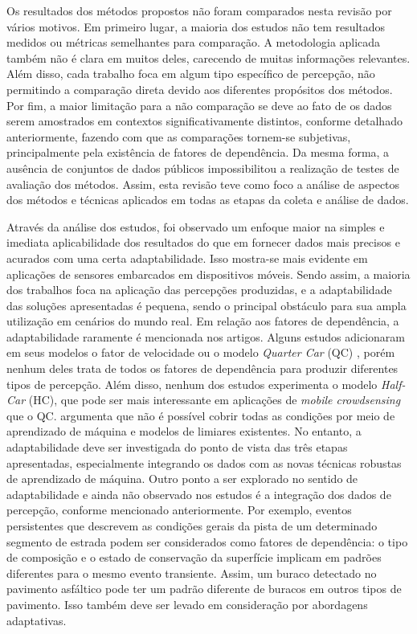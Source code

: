 Os resultados dos métodos propostos não foram comparados nesta revisão por vários motivos. Em primeiro lugar, a maioria dos estudos não tem resultados medidos ou métricas semelhantes para comparação. A metodologia aplicada também não é clara em muitos deles, carecendo de muitas informações relevantes. Além disso, cada trabalho foca em algum tipo específico de percepção, não permitindo a comparação direta devido aos diferentes propósitos dos métodos. Por fim, a maior limitação para a não comparação se deve ao fato de os dados serem amostrados em contextos significativamente distintos, conforme detalhado anteriormente, fazendo com que as comparações tornem-se subjetivas, principalmente pela existência de fatores de dependência. Da mesma forma, a ausência de conjuntos de dados públicos impossibilitou a realização de testes de avaliação dos métodos. Assim, esta revisão teve como foco a análise de aspectos dos métodos e técnicas aplicados em todas as etapas da coleta e análise de dados.

Através da análise dos estudos, foi observado um enfoque maior na simples e imediata aplicabilidade dos resultados do que em fornecer dados mais precisos e acurados com uma certa adaptabilidade. Isso mostra-se mais evidente em aplicações de sensores embarcados em dispositivos móveis. Sendo assim, a maioria dos trabalhos foca na aplicação das percepções produzidas, e a adaptabilidade das soluções apresentadas é pequena, sendo o principal obstáculo para sua ampla utilização em cenários do mundo real. Em relação aos fatores de dependência, a adaptabilidade raramente é mencionada nos artigos. Alguns estudos adicionaram em seus modelos o fator de velocidade ou o modelo \textit{Quarter Car} (QC) \cite{Tomiyama2016}, porém nenhum deles trata de todos os fatores de dependência para produzir diferentes tipos de percepção. Além disso, nenhum dos estudos experimenta o modelo \textit{Half-Car} (HC), que pode ser mais interessante em aplicações de \textit{mobile crowdsensing} que o QC. \cite{Singh2017} argumenta que não é possível cobrir todas as condições por meio de aprendizado de máquina e modelos de limiares existentes. No entanto, a adaptabilidade deve ser investigada do ponto de vista das três etapas apresentadas, especialmente integrando os dados com as novas técnicas robustas de aprendizado de máquina. Outro ponto a ser explorado no sentido de adaptabilidade e ainda não observado nos estudos é a integração dos dados de percepção, conforme mencionado anteriormente. Por exemplo, eventos persistentes que descrevem as condições gerais da pista de um determinado segmento de estrada podem ser considerados como fatores de dependência: o tipo de composição e o estado de conservação da superfície implicam em padrões diferentes para o mesmo evento transiente. Assim, um buraco detectado no pavimento asfáltico pode ter um padrão diferente de buracos em outros tipos de pavimento. Isso também deve ser levado em consideração por abordagens adaptativas.
 
